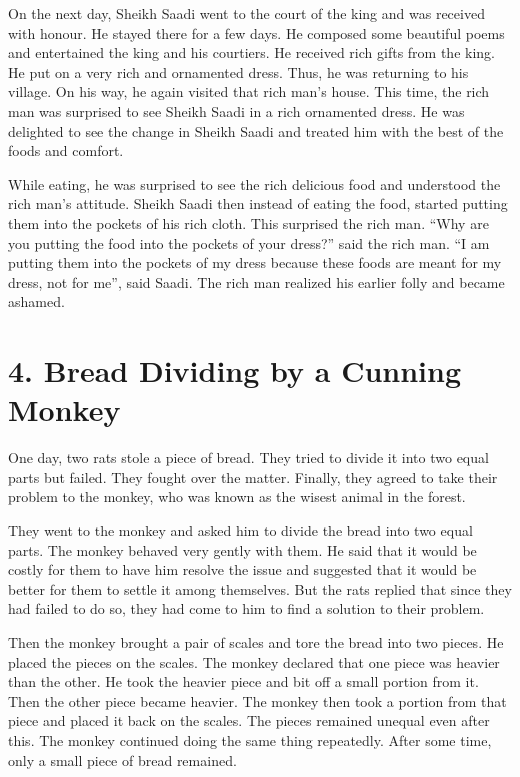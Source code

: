 \documentclass{article}
\begin{document}
On the next day, Sheikh Saadi went to the court of the king and was received with honour. He stayed there for a few days. He composed some beautiful poems and entertained the king and his courtiers. He received rich gifts from the king. He put on a very rich and ornamented dress. Thus, he was returning to his village. On his way, he again visited that rich man’s house. This time, the rich man was surprised to see Sheikh Saadi in a rich ornamented dress. He was delighted to see the change in Sheikh Saadi and treated him with the best of the foods and comfort.

While eating, he was surprised to see the rich delicious food and understood the rich man’s attitude. Sheikh Saadi then instead of eating the food, started putting them into the pockets of his rich cloth. This surprised the rich man. “Why are you putting the food into the pockets of your dress?” said the rich man. “I am putting them into the pockets of my dress because these foods are meant for my dress, not for me”, said Saadi. The rich man realized his earlier folly and became ashamed.

\section*{4. Bread Dividing by a Cunning Monkey}
One day, two rats stole a piece of bread. They tried to divide it into two equal parts but failed. They fought over the matter. Finally, they agreed to take their problem to the monkey, who was known as the wisest animal in the forest.

They went to the monkey and asked him to divide the bread into two equal parts. The monkey behaved very gently with them. He said that it would be costly for them to have him resolve the issue and suggested that it would be better for them to settle it among themselves. But the rats replied that since they had failed to do so, they had come to him to find a solution to their problem.

Then the monkey brought a pair of scales and tore the bread into two pieces. He placed the pieces on the scales. The monkey declared that one piece was heavier than the other. He took the heavier piece and bit off a small portion from it. Then the other piece became heavier. The monkey then took a portion from that piece and placed it back on the scales. The pieces remained unequal even after this. The monkey continued doing the same thing repeatedly. After some time, only a small piece of bread remained.
\end{document}
